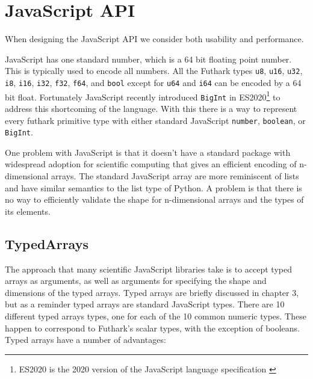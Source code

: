 \documentclass[11pt]{book}
\begin{document}
\section{JavaScript API}

When designing the JavaScript API we consider both usability and performance. 


JavaScript has one standard number, which is a 64 bit floating point number. This is typically used to encode all numbers. All the Futhark types \texttt{u8}, \texttt{u16}, \texttt{u32}, \texttt{i8}, \texttt{i16}, \texttt{i32}, \texttt{f32}, \texttt{f64}, and \texttt{bool} except for \texttt{u64} and \texttt{i64} can be encoded by a 64 bit float. Fortunately JavaScript recently introduced \texttt{BigInt} in ES2020\footnote{ES2020 is the 2020 version of the JavaScript language specification \cite{ecma}} to address this shortcoming of the language. With this there is a way to represent every futhark primitive type with either standard JavaScript \texttt{number}, \texttt{boolean}, or \texttt{BigInt}. %

One problem with JavaScript is that it doesn't have a standard package with widespread adoption for scientific computing that gives an efficient encoding of n-dimensional arrays. The standard JavaScript array are more reminiscent of lists and have similar semantics to the list type of Python. A problem is that there is no way to efficiently validate the shape for n-dimensional arrays and the types of its elements. %



\subsection*{TypedArrays}

The approach that many scientific JavaScript libraries take is to accept typed arrays as arguments, as well as arguments for specifying the shape and dimensions of the typed arrays. Typed arrays are briefly discussed in chapter 3, but as a reminder typed arrays are standard JavaScript types. There are 10 different typed arrays types, one for each of the 10 common numeric types. These happen to correspond to Futhark's scalar types, with the exception of booleans. Typed arrays have a number of advantages:
\end{document}
